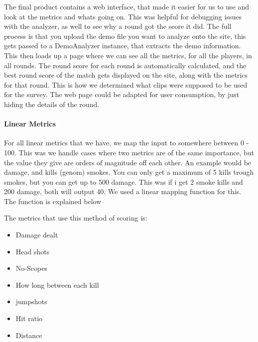 The final product contains a web interface, that made it easier for us to use and look at the metrics and whats going on. This was helpful for debugging issues with the analyzer, as well to see why a round got the score it did. The full process is that you upload the demo file you want to analyze onto the site, this gets passed to a DemoAnalyzer instance, that extracts the demo information. This then loads up a page where we can see all the metrics, for all the players, in all rounds. The round score for each round is automatically calculated, and the best round score of the match gets displayed on the site, along with the metrics for that round. This is how we determined what clips were supposed to be used for the survey. The web page could be adapted for user consumption, by just hiding the details of the round.

\paragraph{Linear Metrics}
For all linear metrics that we have, we map the input to somewhere between 0 - 100. This was we handle cases where two metrics are of the same importance, but the value they give are orders of magnitude off each other. An example would be damage, and kills (genom) smokes. You can only get a maximum of 5 kills trough smokes, but you can get up to 500 damage. This was if i get 2 smoke kills and 200 damage, both will output 40. We used a linear mapping function for this. The function is explained below

The metrics that use this method of scoring is:
\begin{itemize}
    \item Damage dealt
    \item Head shots
    \item No-Scopes
    \item How long between each kill
    \item \Gls{jumpshot}s
    \item Hit ratio
    \item Distance
\end{itemize}

